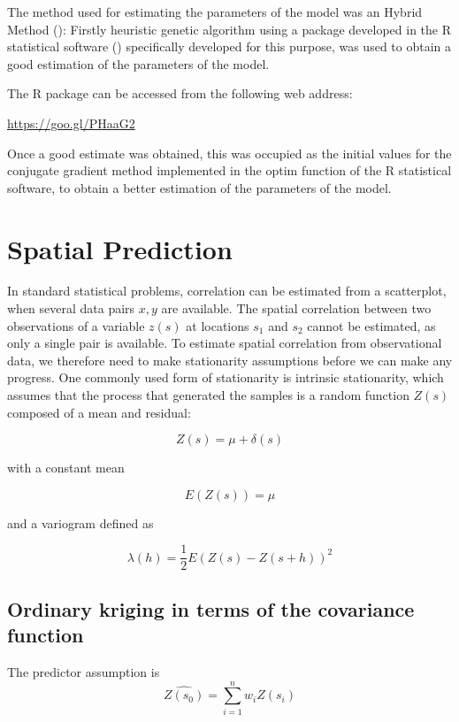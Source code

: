 \documentclass[11pt,twoside]{rmta2010esp}%
\begin{document}
The method used for estimating the parameters of the model was an Hybrid Method (\cite{McNelis2005}): Firstly heuristic genetic algorithm using a package developed in the R statistical software (\cite{rproject}) specifically developed for this purpose, was used to obtain a good estimation of the parameters of the model. 

The R package can be accessed from the following web address:
 
\url{https://goo.gl/PHaaG2}


Once a good estimate was obtained, this was occupied as the initial values for the conjugate gradient method implemented in the optim function of the R statistical software, to obtain a better estimation of the parameters of the model.  


\section{Spatial Prediction}
In standard statistical problems, correlation can be estimated from a scatterplot, when several data pairs ${x, y}$ are available. The spatial correlation between two observations of a variable $z(s)$ at locations $s_{1}$ and $s_{2}$ cannot be estimated, as only a single pair is available. To estimate spatial correlation
from observational data, we therefore need to make stationarity assumptions
before we can make any progress. One commonly used form of stationarity
is intrinsic stationarity, which assumes that the process that generated the
samples is a random function $Z(s)$ composed of a mean and residual:

\begin{equation}
Z(s) = \mu + \delta(s)
\end{equation}

with a constant mean 

\begin{equation}
E\left(Z(s)\right) = \mu
\end{equation}

and a variogram defined as 

\begin{equation}
\lambda(h) = \frac{1}{2}E\left(Z(s) - Z(s+h)\right)^{2}
\end{equation}


\subsection*{Ordinary kriging in terms of the covariance function}
The predictor assumption is 
\begin{equation}
\hat{Z(s_{0})} = \sum_{i=1}^{n} w_{i}Z(s_{i})
\end{equation}
\end{document}
